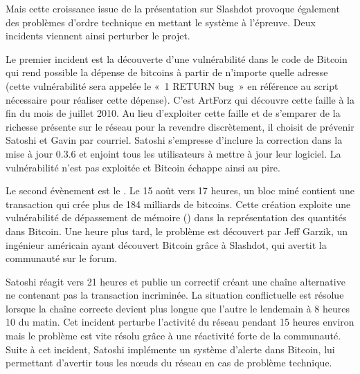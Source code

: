 
Mais cette croissance issue de la présentation sur Slashdot provoque également des problèmes d'ordre technique en mettant le système à l'épreuve. Deux incidents viennent ainsi perturber le projet.

Le premier incident est la découverte d'une vulnérabilité dans le code de Bitcoin qui rend possible la dépense de bitcoins à partir de n'importe quelle adresse (cette vulnérabilité sera appelée le «~1 RETURN bug~» en référence au script nécessaire pour réaliser cette dépense). C'est ArtForz qui découvre cette faille à la fin du mois de juillet 2010. Au lieu d'exploiter cette faille et de s'emparer de la richesse présente sur le réseau pour la revendre discrètement, il choisit de prévenir Satoshi et Gavin par courriel. Satoshi s'empresse d'inclure la correction dans la mise à jour 0.3.6 et enjoint tous les utilisateurs à mettre à jour leur logiciel. La vulnérabilité n'est pas exploitée et Bitcoin échappe ainsi au pire.

Le second évènement est le . Le 15 août vers 17 heures, un bloc miné contient une transaction qui crée plus de 184 milliards de bitcoins. Cette création exploite une vulnérabilité de dépassement de mémoire () dans la représentation des quantités dans Bitcoin. Une heure plus tard, le problème est découvert par Jeff Garzik, un ingénieur américain ayant découvert Bitcoin grâce à Slashdot, qui avertit la communauté sur le forum.

Satoshi réagit vers 21 heures et publie un correctif créant une chaîne alternative ne contenant pas la transaction incriminée. La situation conflictuelle est résolue lorsque la chaîne correcte devient plus longue que l'autre le lendemain à 8 heures 10 du matin. Cet incident perturbe l'activité du réseau pendant 15 heures environ mais le problème est vite résolu grâce à une réactivité forte de la communauté. Suite à cet incident, Satoshi implémente un système d'alerte dans Bitcoin, lui permettant d'avertir tous les nœuds du réseau en cas de problème technique.

